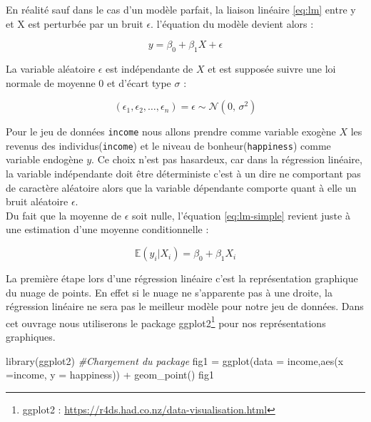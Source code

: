 \documentclass[
]{book}
\newenvironment{Shaded}{\begin{snugshade}}{\end{snugshade}}
\newcommand{\AttributeTok}[1]{\textcolor[rgb]{0.77,0.63,0.00}{#1}}
\newcommand{\CommentTok}[1]{\textcolor[rgb]{0.56,0.35,0.01}{\textit{#1}}}
\newcommand{\FunctionTok}[1]{\textcolor[rgb]{0.00,0.00,0.00}{#1}}
\newcommand{\NormalTok}[1]{#1}
\newcommand{\OtherTok}[1]{\textcolor[rgb]{0.56,0.35,0.01}{#1}}
\newcommand{\SpecialCharTok}[1]{\textcolor[rgb]{0.00,0.00,0.00}{#1}}
\begin{document}
En réalité sauf dans le cas d'un modèle parfait, la liaison linéaire
\eqref{eq:lm} entre y et X est perturbée par un bruit \(\epsilon\).
l'équation du modèle devient alors :

\begin{equation}
y = \beta_0 + \beta_1 X +\epsilon
\label{eq:lm-simple}
\end{equation}

La variable aléatoire \(\epsilon\) est indépendante de \(X\) et est supposée
suivre une loi normale de moyenne \(0\) et d'écart type \(\sigma\) :

\[ (\epsilon_1,\epsilon_2,\dots,\epsilon_n)= \epsilon \sim \mathcal{N}(0,\,\sigma^{2})\]

Pour le jeu de données \texttt{income} nous allons prendre comme variable
exogène \(X\) les revenus des individus(\texttt{income}) et le niveau de
bonheur(\texttt{happiness}) comme variable endogène \(y\). Ce choix n'est pas
hasardeux, car dans la régression linéaire, la variable indépendante
doit être déterministe c'est à un dire ne comportant pas de caractère
aléatoire alors que la variable dépendante comporte quant à elle un
bruit aléatoire \(\epsilon\).\\
Du fait que la moyenne de \(\epsilon\) soit nulle, l'équation
\eqref{eq:lm-simple} revient juste à une estimation d'une moyenne
conditionnelle :

\begin{equation}
\mathbb{E}(y_i|X_i) = \beta_0 + \beta_1 X_i
\label{eq:lm-E}
\end{equation}

La première étape lors d'une régression linéaire c'est la représentation
graphique du nuage de points. En effet si le nuage ne s'apparente pas à
une droite, la régression linéaire ne sera pas le meilleur modèle pour
notre jeu de données. Dans cet ouvrage nous utiliserons le package
ggplot2\footnote{ggplot2 :
  \url{https://r4ds.had.co.nz/data-visualisation.html}} pour nos représentations graphiques.

\begin{Shaded}
\begin{Highlighting}[]
\FunctionTok{library}\NormalTok{(ggplot2) }\CommentTok{\#Chargement du package}
\NormalTok{fig1 }\OtherTok{=} \FunctionTok{ggplot}\NormalTok{(}\AttributeTok{data =}\NormalTok{ income,}\FunctionTok{aes}\NormalTok{(}\AttributeTok{x =}\NormalTok{income, }\AttributeTok{y =}\NormalTok{ happiness)) }\SpecialCharTok{+}
               \FunctionTok{geom\_point}\NormalTok{()}
\NormalTok{fig1}
\end{Highlighting}
\end{Shaded}
\end{document}
